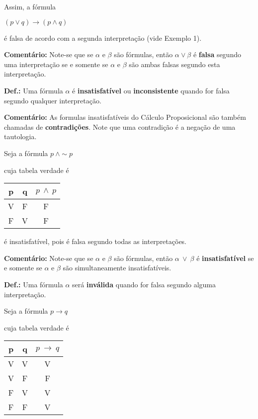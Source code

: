 \noindent Assim, a fórmula

\centerline{$(p \lor q) \to (p \land q)$}

\noindent é falsa de acordo com a segunda interpretação (vide Exemplo 1).

\bigskip
\noindent
\textbf{Comentário:} Note-se que se $\alpha$ e $\beta$ são fórmulas, então $\alpha \lor \beta$ é \textbf{falsa} segundo uma interpretação se e somente se $\alpha$ e $\beta$ são ambas falsas segundo esta interpretação.


\bigskip
\noindent
\textbf{Def.:} Uma fórmula $\alpha$ é \textbf{insatisfatível} ou \textbf{inconsistente} quando for falsa segundo qualquer interpretação.

\bigskip
\noindent
\textbf{Comentário:} As formulas insatisfatíveis do Cálculo Proposicional são também chamadas de \textbf{contradições}.
Note que uma contradição é a negação de uma tautologia.

\begin{exemplo}
    Seja a fórmula $p\ \land \sim p$
\end{exemplo}
\noindent cuja tabela verdade é

\begin{center}
    \begin{tabular}{c c c}
        p & q & $p\ \land ~p$ \\ \hline
        V & F & F \\
        F & V & F
    \end{tabular}
\end{center}
é insatisfatível, pois é falsa segundo todas as interpretações.

\bigskip
\noindent
\textbf{Comentário:} Note-se que se $\alpha$ e $\beta$ são fórmulas, então $\alpha\ \lor\ \beta$ é \textbf{insatisfatível} se e somente se $\alpha$ e $\beta$ são simultaneamente insatisfatíveis.

\bigskip
\noindent
\textbf{Def.:} Uma fórmula $\alpha$ será \textbf{inválida} quando for falsa segundo alguma interpretação.

\begin{exemplo}
    Seja a fórmula $p \to q$
\end{exemplo}
\noindent cuja tabela verdade é

\begin{center}
    \begin{tabular}{c c c}
        p & q & $p\ \to ~q$ \\ \hline
        V & V & V \\
        V & F & F \\
        F & V & V \\
        F & F & V
    \end{tabular}
\end{center}

